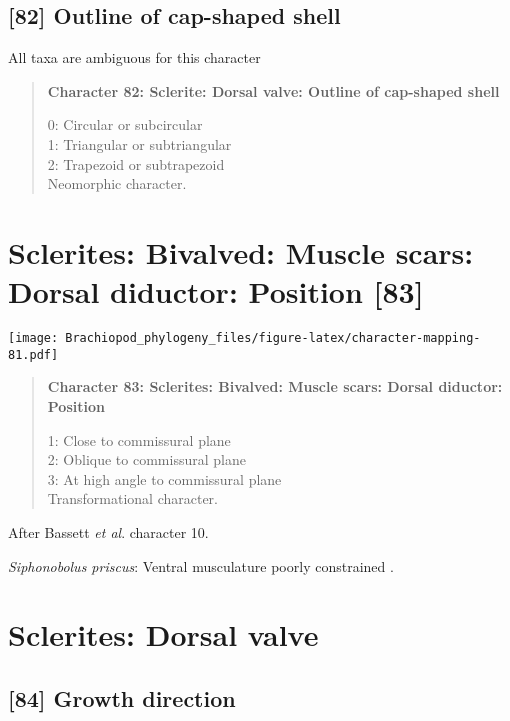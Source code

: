 \documentclass[openany]{book}
\theoremstyle{definition}
\theoremstyle{definition}
\theoremstyle{definition}
\theoremstyle{remark}
\begin{document}
\subsection*{{[}82{]} Outline of cap-shaped
shell}\label{outline-of-cap-shaped-shell}

All taxa are ambiguous for this character

\begin{quote}
\textbf{Character 82: Sclerite: Dorsal valve: Outline of cap-shaped
shell}

0: Circular or subcircular\\
1: Triangular or subtriangular\\
2: Trapezoid or subtrapezoid\\
Neomorphic character.
\end{quote}

\section{Sclerites: Bivalved: Muscle scars: Dorsal diductor: Position
{[}83{]}}\label{sclerites-bivalved-muscle-scars-dorsal-diductor-position-83}

\texttt{[image: Brachiopod\_phylogeny\_files/figure-latex/character-mapping-81.pdf]}

\begin{quote}
\textbf{Character 83: Sclerites: Bivalved: Muscle scars: Dorsal
diductor: Position}

1: Close to commissural plane\\
2: Oblique to commissural plane\\
3: At high angle to commissural plane\\
Transformational character.
\end{quote}

After Bassett \emph{et al}.
\citeyearpar{Bassett2001Functionalmorphology} character 10.

\hypertarget{Siphonobolus_priscus-coding-83}{}
\emph{Siphonobolus priscus}: Ventral musculature poorly constrained
\citep{Williams2000LinguliformeaCraniiformea, Popov2009Earlyontogeny}.

\section{Sclerites: Dorsal valve}\label{sclerites-dorsal-valve}

\subsection*{{[}84{]} Growth direction}\label{growth-direction}
\end{document}
